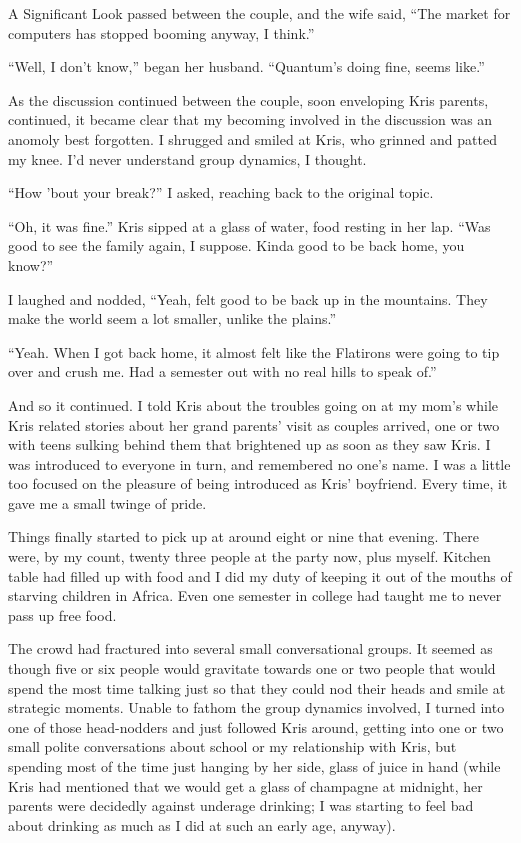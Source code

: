 A Significant Look passed between the couple, and the wife said, ``The market for computers has stopped booming anyway, I think.''

``Well, I don't know,'' began her husband.  ``Quantum's doing fine, seems like.''

As the discussion continued between the couple, soon enveloping Kris parents, continued, it became clear that my becoming involved in the discussion was an anomoly best forgotten.  I shrugged and smiled at Kris, who grinned and patted my knee.  I'd never understand group dynamics, I thought.

``How 'bout your break?'' I asked, reaching back to the original topic.

``Oh, it was fine.''  Kris sipped at a glass of water, food resting in her lap.  ``Was good to see the family again, I suppose.  Kinda good to be back home, you know?''

I laughed and nodded, ``Yeah, felt good to be back up in the mountains.  They make the world seem a lot smaller, unlike the plains.''

``Yeah.  When I got back home, it almost felt like the Flatirons were going to tip over and crush me.  Had a semester out with no real hills to speak of.''

And so it continued.  I told Kris about the troubles going on at my mom's while Kris related stories about her grand parents' visit as couples arrived, one or two with teens sulking behind them that brightened up as soon as they saw Kris.  I was introduced to everyone in turn, and remembered no one's name.  I was a little too focused on the pleasure of being introduced as Kris' boyfriend.  Every time, it gave me a small twinge of pride.

Things finally started to pick up at around eight or nine that evening.  There were, by my count, twenty three people at the party now, plus myself.  Kitchen table had filled up with food and I did my duty of keeping it out of the mouths of starving children in Africa.  Even one semester in college had taught me to never pass up free food.

The crowd had fractured into several small conversational groups.  It seemed as though five or six people would gravitate towards one or two people that would spend the most time talking just so that they could nod their heads and smile at strategic moments.  Unable to fathom the group dynamics involved, I turned into one of those head-nodders and just followed Kris around, getting into one or two small polite conversations about school or my relationship with Kris, but spending most of the time just hanging by her side, glass of juice in hand (while Kris had mentioned that we would get a glass of champagne at midnight, her parents were decidedly against underage drinking; I was starting to feel bad about drinking as much as I did at such an early age, anyway).

